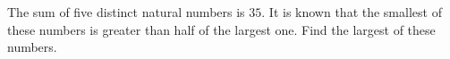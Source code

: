 The sum of five distinct natural numbers is $35$. It is known that the smallest of these numbers is greater than half of the largest one. Find the largest of these numbers.
